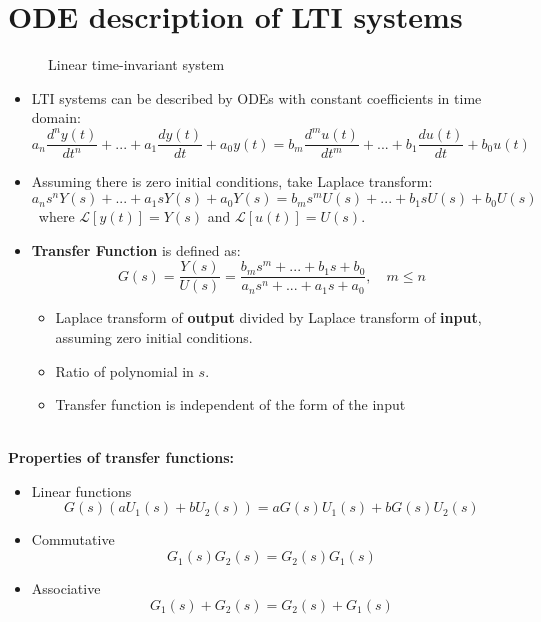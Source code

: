 \section{ODE description of LTI systems}
    \begin{figure}[H] 
        \centering
        
        \caption{Linear time-invariant system}
    \end{figure}
    
\begin{itemize}
    \item LTI systems can be described by ODEs with constant coefficients in time domain:
        \[ a_{n} \frac{d^{n}y(t)}{dt^{n}}+...+a_{1} \frac{dy(t)}{dt}+a_{0} y(t) = b_{m} \frac{d^{m}u(t)}{dt^{m}}+...+b_{1} \frac{du(t)}{dt}+b_{0} u(t) \]

    \item Assuming there is zero initial conditions, take Laplace transform:
        \[ a_{n} s^{n} Y(s)+...+ a_{1} s Y(s) + a_{0} Y(s) = b_{m} s^{m} U(s)+...+b_{1} s U(s) + b_{0} U(s) \]
        \ where $\mathcal{L}[y(t)] = Y(s)$ and $\mathcal{L}[u(t)] = U(s)$. 

    \item \textbf{Transfer Function} is defined as:
        \[ \boxed{G(s)=\frac{Y(s)}{U(s)}=\frac{b_{m} s^{m}+...+b_{1} s +b_{0}}{a_{n} s^{n}+...+a_{1} s+a_{0}},\quad m \leq n }\] 
        
        \begin{itemize}
             \item Laplace transform of \textbf{output} divided by Laplace transform of \textbf{input}, assuming zero initial conditions.
             
             \item Ratio of polynomial in $s$.
             
             \item Transfer function is independent of the form of the input
        \end{itemize}
\end{itemize}
\ \\
\textbf{Properties of transfer functions:}
\begin{itemize}
    \item Linear functions
        \[ 
        G(s) (aU_{1}(s)+bU_{2}(s)) = aG(s)U_{1}(s)+b G(s) U_{2}(s)
        \]
    \item Commutative
        \[G_{1}(s) G_{2}(s) = G_{2}(s)G_{1}(s)\]
    \item Associative
        \[G_{1}(s) +G_{2}(s) = G_{2}(s) +G_{1}(s)\]
\end{itemize}


